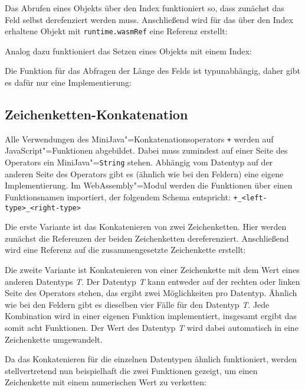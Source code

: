 Das Abrufen eines Objekts über den Index funktioniert so, dass zunächst das Feld selbst derefenziert werden muss. Anschließend wird für das über den Index erhaltene Objekt mit \lstinline{runtime.wasmRef} eine Referenz erstellt:


Analog dazu funktioniert das Setzen eines Objekts mit einem Index:


Die Funktion für das Abfragen der Länge des Felds ist typunabhängig, daher gibt es dafür nur eine Implementierung:



\subsection{Zeichenketten-Konkatenation}
\label{subsec:JavaScript-Zeichenketten-Konkatenation}

Alle Verwendungen des MiniJava"=Konkatenationsoperators \lstinline{+} werden auf JavaScript"=Funktionen abgebildet. Dabei muss zumindest auf einer Seite des Operators ein MiniJava"=\lstinline{String} stehen. Abhängig vom Datentyp auf der anderen Seite des Operators gibt es (ähnlich wie bei den Feldern) eine eigene Implementierung. Im WebAssembly"=Modul werden die Funktionen über einen Funktionsnamen importiert, der folgendem Schema entspricht: \lstinline{+_<left-type>_<right-type>}

Die erste Variante ist das Konkatenieren von zwei Zeichenketten. Hier werden zunächst die Referenzen der beiden Zeichenketten dereferenziert. Anschließend wird eine Referenz auf die zusammengesetzte Zeichenkette erstellt:


Die zweite Variante ist Konkatenieren von einer Zeichenkette mit dem Wert eines anderen Datentyps \emph{T}. Der Datentyp \emph{T} kann entweder auf der rechten oder linken Seite des Operators stehen, das ergibt zwei Möglichkeiten pro Datentyp. Ähnlich wie bei den Feldern gibt es dieselben vier Fälle für den Datentyp \emph{T}. Jede Kombination wird in einer eigenen Funktion implementiert, insgesamt ergibt das somit acht Funktionen. Der Wert des Datentyp \emph{T} wird dabei automatisch in eine Zeichenkette umgewandelt.

Da das Konkatenieren für die einzelnen Datentypen ähnlich funktioniert, werden stellvertretend nun beispielhaft die zwei Funktionen gezeigt, um einen Zeichenkette mit einem numerischen Wert zu verketten:


